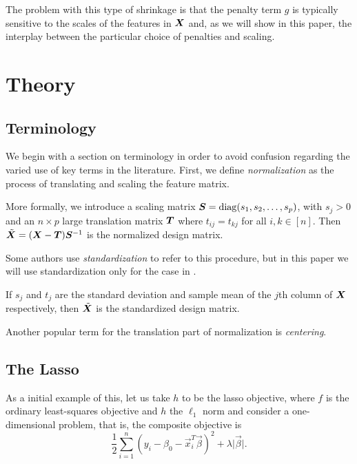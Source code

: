 
The problem with this type of shrinkage is that the penalty term \(g\) is typically sensitive to the scales of the features in \(\mat X\) and, as we will show in this paper, the interplay between the particular choice of penalties and scaling.

\section{Theory}

\subsection{Terminology}

We begin with a section on terminology in order to avoid confusion regarding the varied use of key terms in the literature. First, we define \emph{normalization} as the process of translating and scaling the feature matrix.

More formally, we introduce a scaling matrix \(\mat S = \diag(s_1, s_2, \dots, s_p)\), with \(s_j > 0\) and an \(n \times p\) large translation matrix \(\mat T\) where \(t_{ij} = t_{kj}\) for all \(i,k \in [n]\). Then \(\tilde{\mat X} = (\mat X - \mat T) \mat S^{-1}\) is the normalized design matrix.

Some authors use \emph{standardization} to refer to this procedure, but in this paper we will use standardization only for the case in .

\begin{example}
  \label{ex:standardization}
  If \(s_j\) and \(t_j\) are the standard deviation and sample mean of the \(j\)th column of \(\mat X\) respectively, then \(\tilde{\mat X}\) is the standardized design matrix.
\end{example}

Another popular term for the translation part of normalization is \emph{centering}.

\subsection{The Lasso}

As a initial example of this, let us take \(h\) to be the lasso objective, where \(f\) is the ordinary least-squares objective and \(h\) the \(\ell_1\) norm and consider a one-dimensional problem, that is, the composite objective is
\[
  \frac{1}{2} \sum_{i=1}^n(y_i - \beta_0 - \vec{x}^T_i \vec\beta)^2 + \lambda \lvert \vec\beta \rvert.
\]

